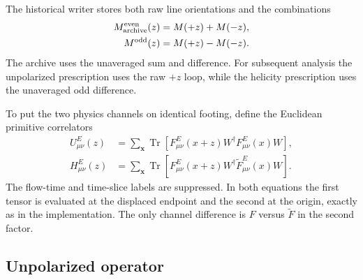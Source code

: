 \documentclass[11pt]{article}
\numberwithin{equation}{section}
\DeclareMathOperator{\Tr}{Tr}
\begin{document}
The historical writer stores both raw line orientations and the combinations
\begin{align}
  M^{\rm even}_{\rm archive}(z)&=M(+z)+M(-z),\\
  M^{\rm odd}(z)&=M(+z)-M(-z).
  \label{eq:gluon-z-projections}
\end{align}
The archive uses the unaveraged sum and difference.  For subsequent analysis
the unpolarized prescription uses the raw \(+z\) loop, while the helicity
prescription uses the unaveraged odd difference.

To put the two physics channels on identical footing, define the Euclidean
primitive correlators
\begin{align}
 U^E_{\mu\nu}(z)
 &=\sum_{\bm x}\Tr\!\left[
 F^E_{\mu\nu}(x+z)W^\dagger
 F^E_{\mu\nu}(x)W\right],
 \label{eq:euclidean-unpolarized-primitive}\\
 H^E_{\mu\nu}(z)
 &=\sum_{\bm x}\Tr\!\left[
 F^E_{\mu\nu}(x+z)W^\dagger
 \widetilde F^E_{\mu\nu}(x)W\right].
 \label{eq:euclidean-helicity-primitive}
\end{align}
The flow-time and time-slice labels are suppressed.  In both equations the
first tensor is evaluated at the displaced endpoint and the second at the
origin, exactly as in the implementation.  The only channel difference is
\(F\) versus \(\widetilde F\) in the second factor.

\subsection{Unpolarized operator}
\end{document}
